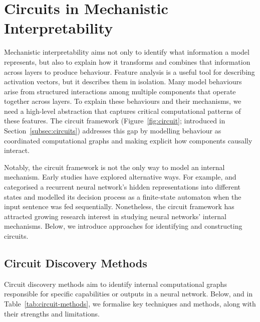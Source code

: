 \section{Circuits in Mechanistic Interpretability}
\label{sec:circuit}
Mechanistic interpretability aims not only to identify what information a model represents, but also to explain how it transforms and combines that information across layers to produce behaviour. Feature analysis is a useful tool for describing activation vectors, but it describes them in isolation. Many model behaviours arise from structured interactions among multiple components that operate together across layers. To explain these behaviours and their mechanisms, we need a high-level abstraction that captures critical computational patterns of these features. The circuit framework (Figure~\ref{fig:circuit}; introduced in Section~\ref{subsec:circuits}) addresses this gap by modelling behaviour as coordinated computational graphs and making explicit how components causally interact. 

Notably, the circuit framework is not the only way to model an internal mechanism. Early studies have explored alternative ways. For example,  and  categorised a recurrent neural network's hidden representations into different states and modelled its decision process as a finite-state automaton when the input sentence was fed sequentially. Nonetheless, the circuit framework has attracted growing research interest in studying neural networks' internal mechanisms. Below, we introduce approaches for identifying and constructing circuits.

\subsection{Circuit Discovery Methods}
\label{sec:circuit-discovery-methods}

Circuit discovery methods aim to identify internal computational graphs responsible for specific capabilities or outputs in a neural network. Below, and in Table~\ref{tab:circuit-methods}, we formalise key techniques and methods, along with their strengths and limitations.

